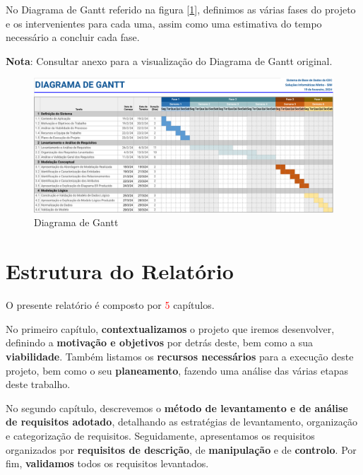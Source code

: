 \documentclass[a4paper,12pt]{scrreprt}
\begin{document}
        No Diagrama de Gantt referido na figura [\ref{fig:1.1}], definimos as várias fases do projeto e os intervenientes para cada uma, assim como uma estimativa do tempo necessário a concluir cada fase.
        
        \textbf{Nota}: Consultar anexo \textit{} para a visualização do Diagrama de Gantt original.

        \begin{figure}
            \centering
            \includegraphics[scale=0.99, angle=270]{images/gantt.pdf}
            \caption{Diagrama de Gantt}
            \label{fig:1.1}
        \end{figure}


    \clearpage
    
    \section{Estrutura do Relatório}
    O presente relatório é composto por \textcolor{red}{5} capítulos.
    
    No primeiro capítulo, \textbf{contextualizamos} o projeto que iremos desenvolver, definindo a \textbf{motivação e objetivos} por detrás deste, bem como a sua \textbf{viabilidade}. Também listamos os \textbf{recursos necessários} para a execução deste projeto, bem como o seu \textbf{planeamento}, fazendo uma análise das várias etapas deste trabalho.

    No segundo capítulo, descrevemos o \textbf{método de levantamento e de análise de requisitos adotado}, detalhando as estratégias de levantamento, organização e categorização de requisitos. Seguidamente, apresentamos os requisitos organizados por \textbf{requisitos de descrição}, de \textbf{manipulação} e de \textbf{controlo}. Por fim, \textbf{validamos} todos os requisitos levantados.
\end{document}
